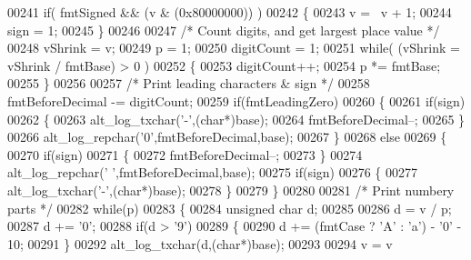 \begin{DoxyCode}
{{{00241                 \textcolor{keywordflow}{if}( fmtSigned && (v & (0x80000000)) )
00242                   \{
00243                   v = ~v + 1;
00244                   sign = 1;
00245                   \}
00246 
00247                 \textcolor{comment}{/* Count digits, and get largest place value */}
00248                 vShrink = v;
00249                 p = 1;
00250                 digitCount = 1;
00251                 \textcolor{keywordflow}{while}( (vShrink = vShrink / fmtBase) > 0 )
00252                   \{
00253                   digitCount++;
00254                   p *= fmtBase;
00255                   \}
00256 
00257                 \textcolor{comment}{/* Print leading characters & sign */}
00258                 fmtBeforeDecimal -= digitCount;
00259                 \textcolor{keywordflow}{if}(fmtLeadingZero)
00260                   \{
00261                   \textcolor{keywordflow}{if}(sign)
00262                     \{
00263                     alt\_log\_txchar(\textcolor{charliteral}{'-'},(\textcolor{keywordtype}{char}*)base);
00264                     fmtBeforeDecimal--;
00265                     \}
00266                   alt\_log\_repchar(\textcolor{charliteral}{'0'},fmtBeforeDecimal,base);
00267                   \}
00268                 \textcolor{keywordflow}{else}
00269                   \{
00270                     \textcolor{keywordflow}{if}(sign)
00271                     \{
00272                       fmtBeforeDecimal--;
00273                     \}
00274                     alt\_log\_repchar(\textcolor{charliteral}{' '},fmtBeforeDecimal,base);
00275                     \textcolor{keywordflow}{if}(sign)
00276                     \{
00277                       alt\_log\_txchar(\textcolor{charliteral}{'-'},(\textcolor{keywordtype}{char}*)base);
00278                     \}
00279                   \}
00280 
00281                 \textcolor{comment}{/* Print numbery parts */}
00282                 \textcolor{keywordflow}{while}(p)
00283                   \{
00284                   \textcolor{keywordtype}{unsigned} \textcolor{keywordtype}{char} d;
00285 
00286                   d = v / p;
00287                   d += \textcolor{charliteral}{'0'};
00288                   \textcolor{keywordflow}{if}(d > \textcolor{charliteral}{'9'})
00289                   \{
00290                     d += (fmtCase ? \textcolor{charliteral}{'A'} : \textcolor{charliteral}{'a'}) - \textcolor{charliteral}{'0'} - 10;
00291                   \}
00292                   alt\_log\_txchar(d,(\textcolor{keywordtype}{char}*)base);
00293 
00294                   v = v %
}}}
\end{DoxyCode}
